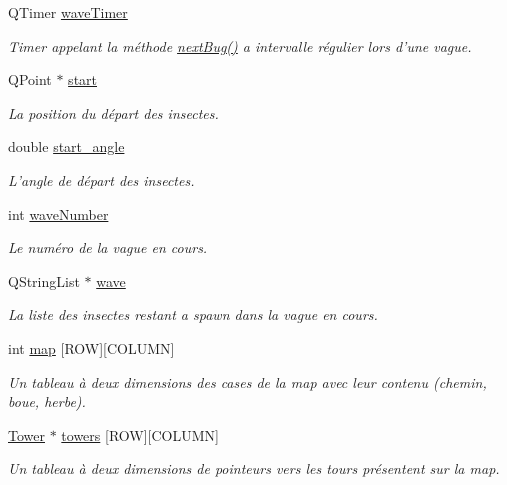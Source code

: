 \begin{DoxyCompactItemize}
\item 
QTimer \hyperlink{classRender_a6351bb3de99ef093995785788c1d218e}{waveTimer}
\begin{DoxyCompactList}\small\item\em Timer appelant la méthode \hyperlink{classRender_a9413625fc472b4b7806f3a0d615d6ea9}{nextBug()} a intervalle régulier lors d'une vague. \end{DoxyCompactList}\item 
QPoint $\ast$ \hyperlink{classRender_afa2c3b6d106bf91639ddf351d7d3315e}{start}
\begin{DoxyCompactList}\small\item\em La position du départ des insectes. \end{DoxyCompactList}\item 
double \hyperlink{classRender_ab66f1b35519a6e9d6fe14e75a6973680}{start\_\-angle}
\begin{DoxyCompactList}\small\item\em L'angle de départ des insectes. \end{DoxyCompactList}\item 
int \hyperlink{classRender_a682e96907f3d52f710df4e9c2a5e9d07}{waveNumber}
\begin{DoxyCompactList}\small\item\em Le numéro de la vague en cours. \end{DoxyCompactList}\item 
QStringList $\ast$ \hyperlink{classRender_a6b5e2349a706152d4763d22b995e9237}{wave}
\begin{DoxyCompactList}\small\item\em La liste des insectes restant a spawn dans la vague en cours. \end{DoxyCompactList}\item 
int \hyperlink{classRender_a9c7793879c5007b8cae3a9c2885d283f}{map} \mbox{[}ROW\mbox{]}\mbox{[}COLUMN\mbox{]}
\begin{DoxyCompactList}\small\item\em Un tableau à deux dimensions des cases de la map avec leur contenu (chemin, boue, herbe). \end{DoxyCompactList}\item 
\hyperlink{classTower}{Tower} $\ast$ \hyperlink{classRender_a7b01b65692570fe6dec24d0a5c1aa178}{towers} \mbox{[}ROW\mbox{]}\mbox{[}COLUMN\mbox{]}
\begin{DoxyCompactList}\small\item\em Un tableau à deux dimensions de pointeurs vers les tours présentent sur la map. \end{DoxyCompactList}\item 

\end{DoxyCompactItemize}
